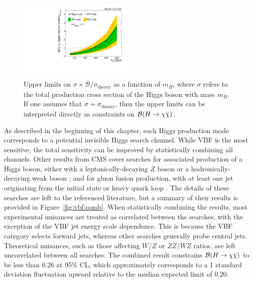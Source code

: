 \begin{figure}[]
    \begin{center}
        \includegraphics[width=0.5\textwidth]{figures/vbf/fits/mhscan_ggf.pdf}
        \caption{Upper limits on $\sigma\times \mathcal{B}/\sigma_\mathrm{theory}$ as a function of $m_H$, where $\sigma$ refers to the total production cross section of the Higgs boson with mass $m_H$.
                 If one assumes that $\sigma = \sigma_\mathrm{theory}$, then the upper limits can be interpreted directly as constraints on $\mathcal{B}(H\rightarrow\chi\bar\chi)$.}
        \label{fig:vbf:mhscan}
    \end{center}
\end{figure}

As described in the beginning of this chapter, each Higgs production mode corresponds to a potential invisible Higgs search channel.
While VBF is the most sensitive, the total sensitivity can be improved by statistically combining all channels.
Other results from CMS cover searches for associated production of a Higgs boson, either with a leptonically-decaying $Z$ boson \cite{zhinv} or a hadronically-decaying weak boson \cite{monojet}; and for gluon fusion production, with at least one jet originating from the initial state or heavy quark loop \cite{monojet}. 
The details of these searches are left to the referenced literature, but a summary of their results is provided in Figure~\ref{fig:vbf:comb}.
When statistically combining the results, most experimental nuisances are treated as correlated between the searches, with the exception of the VBF jet energy scale dependence.
This is because the VBF category selects forward jets, whereas other searches generally probe central jets.
Theoretical nuisances, such as those affecting $W/Z$ or $ZZ/WZ$ ratios, are left uncorrelated between all searches.
The combined result constrains $\mathcal{B}(H\rightarrow\chi\bar\chi)$ to be less than $0.26$ at 95\% CL, which approximately corresponds to a 1 standard deviation fluctuation upward relative to the median expected limit of $0.20$.

